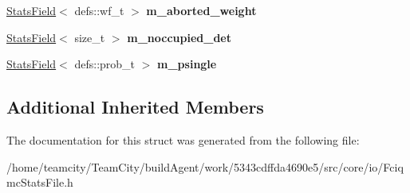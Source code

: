 \begin{DoxyCompactItemize}
\item 
\hyperlink{classStatsField}{Stats\+Field}$<$ defs\+::wf\+\_\+t $>$ {\bfseries m\+\_\+aborted\+\_\+weight}\hypertarget{structFciqmcStatsFile_afd1f51baf902f34321c97c10f09fbfc1}{}\label{structFciqmcStatsFile_afd1f51baf902f34321c97c10f09fbfc1}

\item 
\hyperlink{classStatsField}{Stats\+Field}$<$ size\+\_\+t $>$ {\bfseries m\+\_\+noccupied\+\_\+det}\hypertarget{structFciqmcStatsFile_aba0ef2d54fe7a9ac7dfdf445853abd1c}{}\label{structFciqmcStatsFile_aba0ef2d54fe7a9ac7dfdf445853abd1c}

\item 
\hyperlink{classStatsField}{Stats\+Field}$<$ defs\+::prob\+\_\+t $>$ {\bfseries m\+\_\+psingle}\hypertarget{structFciqmcStatsFile_ac3fa2541af043bd215490f2d4e9cde5a}{}\label{structFciqmcStatsFile_ac3fa2541af043bd215490f2d4e9cde5a}

\end{DoxyCompactItemize}
\subsection*{Additional Inherited Members}


The documentation for this struct was generated from the following file\+:\begin{DoxyCompactItemize}
\item 
/home/teamcity/\+Team\+City/build\+Agent/work/5343cdffda4690e5/src/core/io/Fciqmc\+Stats\+File.\+h\end{DoxyCompactItemize}
